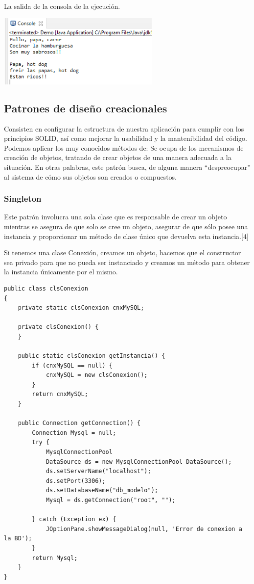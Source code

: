\documentclass[twoside,twocolumn]{article}
\begin{document}
La salida de la consola de la ejecución.

\includegraphics[width=8cm]{Imagenes/imagen5}


\subsection{Patrones de diseño creacionales}


Consisten en configurar la estructura de nuestra aplicación para cumplir con los principios SOLID, así como mejorar la usabilidad y la mantenibilidad del código. Podemos aplicar los muy conocidos métodos de:
Se ocupa de los mecanismos de creación de objetos, tratando de crear objetos de una manera adecuada a la situación.
En otras palabras, este patrón busca, de alguna manera “despreocupar” al sistema de cómo sus objetos son creados o compuestos.



\subsubsection{Singleton}


Este patrón involucra una sola clase que es responsable de crear un objeto mientras se asegura de que solo se cree un objeto, asegurar de que sólo posee una instancia y proporcionar un método de clase único que devuelva esta instancia.[4]




Si tenemos una clase Conexión, creamos un objeto, hacemos que el constructor sea privado para que no pueda ser instanciado y creamos un método para obtener la instancia únicamente por el mismo.
\lstset{breaklines=true,style=sharpc}
\begin{lstlisting}
public class clsConexion
{
    private static clsConexion cnxMySQL;

    private clsConexion() {
    }    

    public static clsConexion getInstancia() {
        if (cnxMySQL == null) {
            cnxMySQL = new clsConexion();
        }
        return cnxMySQL;
    }

    public Connection getConnection() {
        Connection Mysql = null;
        try {
            MysqlConnectionPool 
            DataSource ds = new MysqlConnectionPool DataSource();
            ds.setServerName("localhost");
            ds.setPort(3306);
            ds.setDatabaseName("db_modelo");
            Mysql = ds.getConnection("root", "");

        } catch (Exception ex) {
            JOptionPane.showMessageDialog(null, 'Error de conexion a la BD');
        }
        return Mysql;
    }
}
\end{lstlisting}
\end{document}
